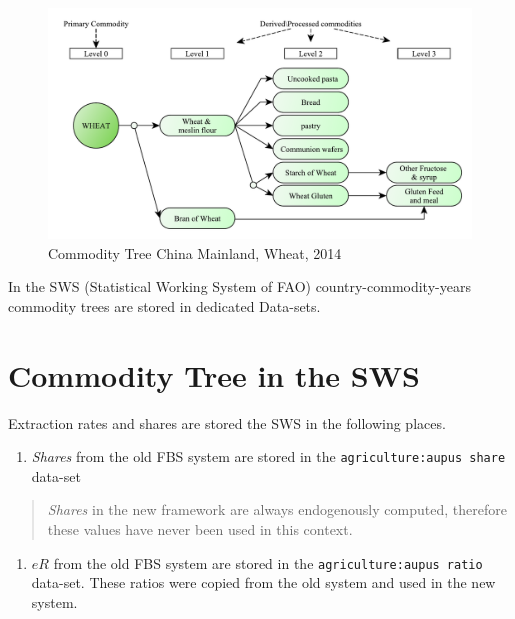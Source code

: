 \documentclass[]{article}
\providecommand{\tightlist}{%
  \setlength{\itemsep}{0pt}\setlength{\parskip}{0pt}}
\begin{document}
\begin{figure}[H]

{\centering \includegraphics[width=0.9\linewidth]{images/commodityTree/02_WheatTree} 

}

\caption{\label{fig:f2}Commodity Tree China Mainland, Wheat, 2014}\label{fig:f2}
\end{figure}

In the SWS (Statistical Working System of FAO) country-commodity-years
commodity trees are stored in dedicated Data-sets.

\section{Commodity Tree in the SWS}\label{commodity-tree-in-the-sws}

Extraction rates and shares are stored the SWS in the following places.

\begin{enumerate}
\def\labelenumi{\arabic{enumi}.}
\tightlist
\item
  \emph{Shares} from the old FBS system are stored in the
  \texttt{agriculture:aupus\ share} data-set
\end{enumerate}

\begin{quote}
\emph{Shares} in the new framework are always endogenously computed,
therefore these values have never been used in this context.
\end{quote}

\begin{enumerate}
\def\labelenumi{\arabic{enumi}.}
\setcounter{enumi}{1}
\tightlist
\item
  \(eR\) from the old FBS system are stored in the
  \texttt{agriculture:aupus\ ratio} data-set. These ratios were copied
  from the old system and used in the new system.
\end{enumerate}
\end{document}
